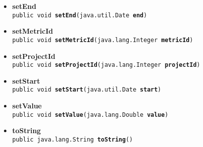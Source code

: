{{{{{\begin{itemize}
{\texttt{public native int\ {\bf  hashCode}()
\label{it.unisa.sesa.repominer.db.entities.ProjectMetric.hashCode()}}%
}%
\item{ 
\hypertarget{it.unisa.sesa.repominer.db.entities.ProjectMetric.setEnd(java.util.Date)}{{\bf  setEnd}\\}
\texttt{public void\ {\bf  setEnd}(\texttt{java.util.Date} {\bf  end})
\label{it.unisa.sesa.repominer.db.entities.ProjectMetric.setEnd(java.util.Date)}}%
}%
\item{ 
\hypertarget{it.unisa.sesa.repominer.db.entities.ProjectMetric.setMetricId(java.lang.Integer)}{{\bf  setMetricId}\\}
\texttt{public void\ {\bf  setMetricId}(\texttt{java.lang.Integer} {\bf  metricId})
\label{it.unisa.sesa.repominer.db.entities.ProjectMetric.setMetricId(java.lang.Integer)}}%
}%
\item{ 
\hypertarget{it.unisa.sesa.repominer.db.entities.ProjectMetric.setProjectId(java.lang.Integer)}{{\bf  setProjectId}\\}
\texttt{public void\ {\bf  setProjectId}(\texttt{java.lang.Integer} {\bf  projectId})
\label{it.unisa.sesa.repominer.db.entities.ProjectMetric.setProjectId(java.lang.Integer)}}%
}%
\item{ 
\hypertarget{it.unisa.sesa.repominer.db.entities.ProjectMetric.setStart(java.util.Date)}{{\bf  setStart}\\}
\texttt{public void\ {\bf  setStart}(\texttt{java.util.Date} {\bf  start})
\label{it.unisa.sesa.repominer.db.entities.ProjectMetric.setStart(java.util.Date)}}%
}%
\item{ 
\hypertarget{it.unisa.sesa.repominer.db.entities.ProjectMetric.setValue(java.lang.Double)}{{\bf  setValue}\\}
\texttt{public void\ {\bf  setValue}(\texttt{java.lang.Double} {\bf  value})
\label{it.unisa.sesa.repominer.db.entities.ProjectMetric.setValue(java.lang.Double)}}%
}%
\item{ 
\hypertarget{it.unisa.sesa.repominer.db.entities.ProjectMetric.toString()}{{\bf  toString}\\}
\texttt{public java.lang.String\ {\bf  toString}()
\label{it.unisa.sesa.repominer.db.entities.ProjectMetric.toString()}}%
}%
\end{itemize}
}
}}}}
